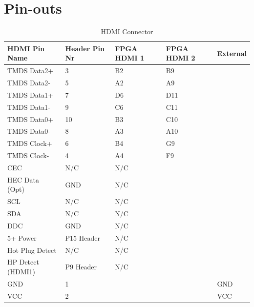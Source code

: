 \chapter{Pin-outs}
\label{app:pinouts}
\begin{table}[h]
    \centering
    \begin{tabular}{lllll}
        HDMI Pin Name            & Header Pin Nr & FPGA HDMI 1 & FPGA HDMI 2 & External \\
        \hline
        TMDS Data2+              & 3             & B2              & B9              &          \\
        TMDS Data2-              & 5             & A2              & A9              &          \\
        TMDS Data1+              & 7             & D6              & D11             &          \\
        TMDS Data1-              & 9             & C6              & C11             &          \\
        TMDS Data0+              & 10            & B3              & C10             &          \\
        TMDS Data0-              & 8             & A3              & A10             &          \\
        TMDS Clock+              & 6             & B4              & G9              &          \\
        TMDS Clock-              & 4             & A4              & F9              &          \\
        CEC                      & N/C           & N/C             &                 &          \\
        HEC Data (Opt)           & GND           & N/C             &                 &          \\
        SCL                      & N/C           & N/C             &                 &          \\
        SDA                      & N/C           & N/C             &                 &          \\
        DDC                      & GND           & N/C             &                 &          \\
        5+ Power                 & P15 Header    & N/C             &                 &          \\
        Hot Plug Detect          & N/C           & N/C             &                 &          \\
        HP Detect (HDMI1) & P9 Header     & N/C             &                 &          \\
        GND & 1             &                 &                 & GND      \\
        VCC & 2             &                 &                 & VCC      \\
    \end{tabular}
    \caption{HDMI Connector}
    \label{HDMI_Connector}
\end{table}

